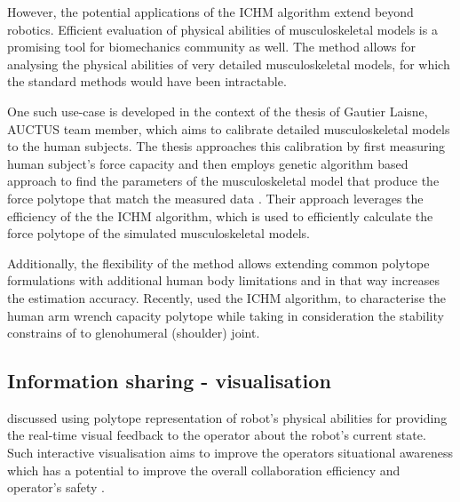 However, the potential applications of the ICHM algorithm extend beyond robotics. Efficient evaluation of physical abilities of musculoskeletal models is a promising tool for biomechanics community as well. The method allows for analysing the physical abilities of very detailed musculoskeletal models, for which the standard methods would have been intractable. 

One such use-case is developed in the context of the thesis of Gautier Laisne, AUCTUS team member, which aims to calibrate detailed musculoskeletal models to the human subjects. The thesis approaches this calibration by first measuring human subject's force capacity and then employs genetic algorithm based approach to find the parameters of the musculoskeletal model that produce the force polytope that match the measured data \cite{laisne2023Genetic}. Their approach leverages the efficiency of the the ICHM algorithm, which is used to efficiently calculate the force polytope of the simulated musculoskeletal models.  

Additionally, the flexibility of the method allows extending common polytope formulations with additional human body limitations and in that way increases the estimation accuracy. Recently, \citet{rezzoug2023simulation} used the ICHM algorithm, to characterise the human arm wrench capacity polytope while taking in consideration the stability constrains of to glenohumeral (shoulder) joint.  




\subsection{Information sharing - visualisation}

 discussed using polytope representation of robot's physical abilities for providing the real-time visual feedback to the operator about the robot's current state. Such interactive visualisation aims to improve the operators situational awareness which has a potential to improve the overall collaboration efficiency and operator's safety \cite{Camblor2022Signaling}. 

